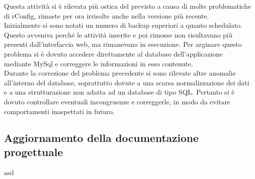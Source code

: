 \documentclass[Realizzazione.tex]{subfiles}
\begin{document}
Questa attività si è rilevata più ostica del previsto a causa di molte problematiche di rConfig, rimaste per ora irrisolte anche nella versione più recente. \\
Inizialmente si sono notati un numero di backup superiori a quanto schedulato. Questo avveniva perché le attività inserite e poi rimosse non risultavano più presenti dall'interfaccia web, ma rimanevano in esecuzione. Per arginare questo problema si è dovuto accedere direttamente al database dell'applicazione mediante MySql e correggere le informazioni in esso contenute. \\
Durante la correzione del problema precedente si sono rilevate altre anomalie all'interno del database, soprattutto dovute a una scarsa normalizzazione dei dati e a una strutturazione non adatta ad un database di tipo SQL. Pertanto si è dovuto controllare eventuali incongruenze e correggerle, in modo da evitare comportamenti inaspettati in futuro. \\


\subsection{Aggiornamento della documentazione progettuale}
asd

	
\end{document}
